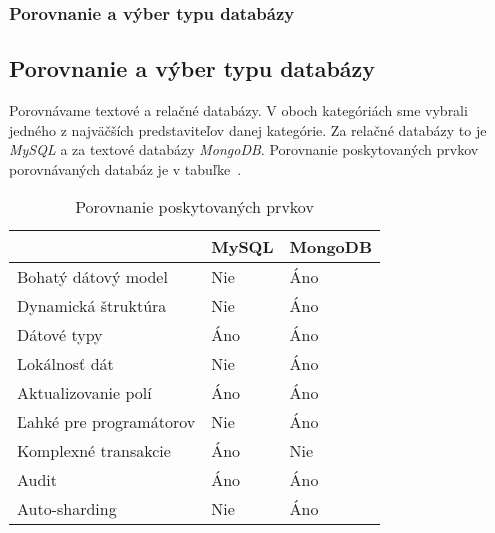 %
%
{
	\subsubsection{Porovnanie a výber typu databázy}
}
{
	\subsection{Porovnanie a výber typu databázy}
}
\label{subsubsection:compare_dbs}

Porovnávame textové a relačné databázy. V oboch kategóriách sme vybrali jedného z najväčších predstaviteľov danej kategórie. Za relačné databázy to je \textit{MySQL} a za textové databázy \textit{MongoDB}. Porovnanie poskytovaných prvkov porovnávaných databáz je v tabuľke~. 

\begin{table}[H]
	\centering
	\caption{Porovnanie poskytovaných prvkov}
	\label{table:features_of_mongodb}
	\begin{tabular}{|l|l|l|}
		\hline
		& \textbf{MySQL} & \textbf{MongoDB} \\ \hline
		Bohatý dátový model & Nie & Áno \\ \hline
		Dynamická štruktúra & Nie & Áno \\ \hline
		Dátové typy & Áno & Áno \\ \hline
		Lokálnosť dát & Nie & Áno \\ \hline
		Aktualizovanie polí & Áno & Áno \\ \hline
		Ľahké pre programátorov & Nie & Áno \\ \hline
		Komplexné transakcie & Áno & Nie \\ \hline
		Audit & Áno & Áno \\ \hline
		Auto-sharding & Nie & Áno \\ \hline
	\end{tabular}
\end{table}

